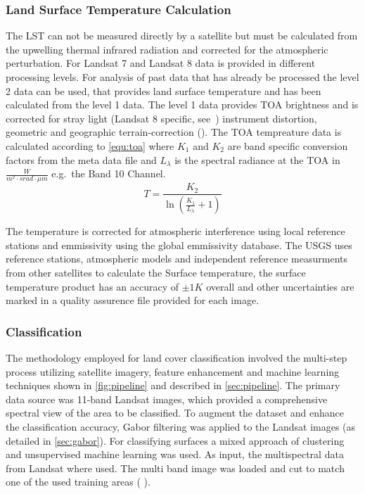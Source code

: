 \documentclass[12pt,a4paper, english]{article}
\begin{document}
	\subsubsection{Land Surface Temperature Calculation}\label{sec:lstcalc}
    The \gls{LST} can not be measured directly by a satellite but must be calculated from the upwelling thermal infrared radiation and corrected for the atmospheric perturbation. 
    For Landsat 7 and Landsat 8 data is provided in different processing levels.
    For analysis of past data that has already be processed the level 2 data can be used, that provides land surface temperature and has been calculated from the level 1 data. 
    The level 1 data provides \gls{TOA} brightness and is corrected for stray light (Landsat 8 specific, see~\cite[p.~67]{Zanter2019}) instrument distortion, geometric and geographic terrain-correction (\cite[p.~44]{Zanter2019}).
    The \gls{TOA} tempreature data is calculated according to \cref{equ:toa} where $K_1$ and $K_2$ are band specific conversion factors from the meta data file and $L_\lambda$ is the spectral radiance at the TOA in $\frac{W}{m^2\cdot srad \cdot \mu m}$ e.g.\ the Band 10 Channel. 
    \begin{equation}\label{equ:toa}
	    T = \frac{K_2}{\ln\left(\frac{K_1}{L_{\lambda}}+1\right)}
    \end{equation}
 
    The temperature is corrected for atmospheric interference using local reference stations and emmissivity using the global emmissivity database.  %
    The USGS uses reference stations, atmospheric models and independent reference measurments from other satellites to calculate the Surface temperature, the surface temperature product has an accuracy of $\pm 1 K$ overall and other uncertainties are marked in a quality assurence file provided for each image.
    \subsubsection{Classification }\label{sec:classification}
    The methodology employed for land cover classification involved the multi-step process utilizing satellite imagery, feature enhancement and machine learning techniques shown in \cref{fig:pipeline} and described in \cref{sec:pipeline}.
    The primary data source was 11-band Landsat images, which provided a comprehensive spectral view of the area to be classified.
    To augment the dataset and enhance the classification accuracy, Gabor filtering was applied to the Landsat images (as detailed in \cref{sec:gabor}).
    For classifying surfaces a mixed approach of clustering and unsupervised machine learning was used. 
    As input, the multispectral data from Landsat where used.
    The multi band image was loaded and cut to match one of the used training areas (%
). 
\end{document}
